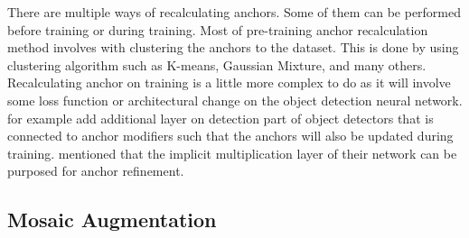   There are multiple ways of recalculating anchors. Some of them can be performed before training or during training.
  Most of pre-training anchor recalculation method involves with clustering the anchors to the dataset. This is done by
  using clustering algorithm such as K-means, Gaussian Mixture, and many others. Recalculating anchor on training is 
  a little more complex to do as it will involve some loss function or architectural change on the object detection neural network.
  \textcite{anchoropt} for example add additional layer on detection part of object detectors that is connected to anchor modifiers such that
  the anchors will also be updated during training. \textcite{yolor} mentioned that the implicit multiplication layer of their network
  can be purposed for anchor refinement.



  \subsection{Mosaic Augmentation}
  \label{section:mosaic_study}


